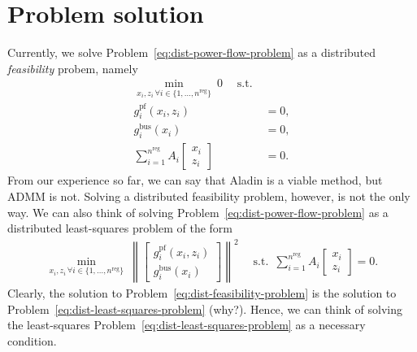 \documentclass{article}
\newcommand{\n}{n}
\newcommand{\nregions}{\n^{\text{reg}}}
\newcommand{\stateCore}{x}
\newcommand{\stateCopy}{z}
\newcommand{\pf}{g^{\text{pf}}}
\newcommand{\busspecs}{g^{\text{bus}}}
\newcommand{\norm}[1]{\left\lVert#1\right\rVert}
\begin{document}
\section{Problem solution}
Currently, we solve Problem~\ref{eq:dist-power-flow-problem} as a distributed \emph{feasibility} probem, namely
\begin{subequations}
    \label{eq:dist-feasibility-problem}
    \begin{align}
        \underset{\stateCore_i, \stateCopy_i \, \forall i \in  \{1, \dots, \nregions\}}{\operatorname{min}} \: 0 \quad \operatorname{s.t.}\\
        \pf_i( \stateCore_i, \stateCopy_i ) &= 0, \\
        \busspecs_i ( \stateCore_i ) &= 0, \\
        \sum_{i = 1}^{\nregions} A_i \begin{bmatrix}
            \stateCore_i \\
            \stateCopy_i
        \end{bmatrix}
        &= 0.
    \end{align}
\end{subequations}
From our experience so far, we can say that Aladin is a viable method, but ADMM is not.
Solving a distributed feasibility problem, however, is not the only way.
We can also think of solving Problem~\ref{eq:dist-power-flow-problem} as a distributed least-squares problem of the form
\begin{subequations}
    \label{eq:dist-least-squares-problem}
    \begin{align}
        \underset{\stateCore_i, \stateCopy_i \, \forall i \in  \{1, \dots, \nregions\}}{\operatorname{min}} \: \norm{\begin{bmatrix}
            \pf_i( \stateCore_i, \stateCopy_i ) \\
            \busspecs_i ( \stateCore_i )
        \end{bmatrix}}^2 \quad \operatorname{s.t.} ~ \sum_{i = 1}^{\nregions} A_i \begin{bmatrix}
            \stateCore_i \\
            \stateCopy_i
        \end{bmatrix}
        = 0.
    \end{align}
\end{subequations}
Clearly, the solution to Problem~\ref{eq:dist-feasibility-problem} is the solution to Problem~\ref{eq:dist-least-squares-problem} (why?).
Hence, we can think of solving the least-squares Problem~\ref{eq:dist-least-squares-problem} as a necessary condition.
\end{document}
